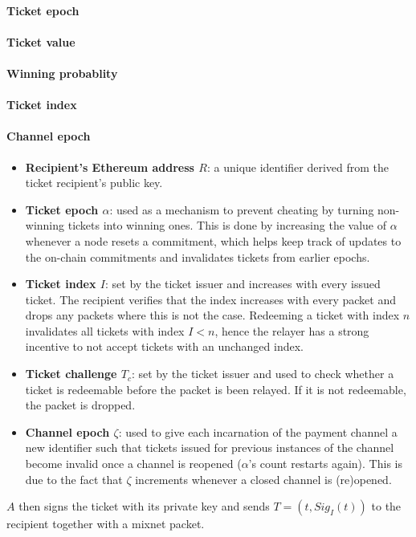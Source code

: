 \paragraph{Ticket epoch}
\label{sec:tickets:issuance:ticketepoch}

\paragraph{Ticket value}
\label{sec:tickets:issuance:ticketvalue}

\paragraph{Winning probablity}
\label{sec:tickets:issuance:winningprobability}

\paragraph{Ticket index}
\label{sec:tickets:issuance:ticketindex}

\paragraph{Channel epoch}
\label{sec:tickets:issuance:channelepoch}

\begin{itemize}
      \item
            \textbf{Recipient's Ethereum address $R$}: a unique identifier derived from the ticket recipient's public key.
      \item
            \textbf{Ticket epoch $\alpha$}: used as a mechanism to prevent cheating by turning non-winning tickets into winning ones. This is done by increasing the value of $\alpha$ whenever a node resets a commitment, which helps keep track of updates to the on-chain commitments and invalidates tickets from earlier epochs.
      \item
            \textbf{Ticket index $I$}: set by the ticket issuer and increases with every issued ticket. The recipient verifies that the index increases with every packet and drops any packets where this is not the case. Redeeming a ticket with index $n$ invalidates all tickets with index $I<n$, hence the relayer has a strong incentive to not accept tickets with an unchanged index.
      \item
            \textbf{Ticket challenge $T_c$}: set by the ticket issuer and used to check whether a ticket is redeemable before the packet is been relayed. If it is not redeemable, the packet is dropped.
      \item
            \textbf{Channel epoch $\zeta$}: used to give each incarnation of the payment channel a new identifier such that tickets issued for previous instances of the channel become invalid once a channel is reopened ($\alpha$'s count restarts again). This is due to the fact that $\zeta$ increments whenever a closed channel is (re)opened.
\end{itemize}

$A$ then signs the ticket with its private key and sends $T = (t, Sig_I(t))$ to the recipient together with a mixnet packet.